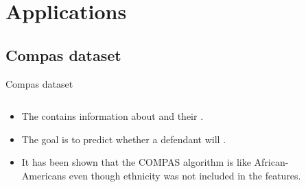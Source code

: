 \section{Applications}

\subsection{Compas dataset}
\begin{frame}{Compas dataset}
    \begin{columns}
        \begin{column}{0.65\textwidth}
        \begin{itemize}
            \item The  contains information about  and their .
            \item The goal is to predict whether a defendant will .
            \item It has been shown that the COMPAS algorithm is  like African-Americans even though ethnicity was not included in the features.
        \end{itemize}
        \end{column}
        \begin{column}{0.35\textwidth}
        \begin{figure}
            \centering

\end{figure}
\end{column}
\end{columns}
\end{frame}

